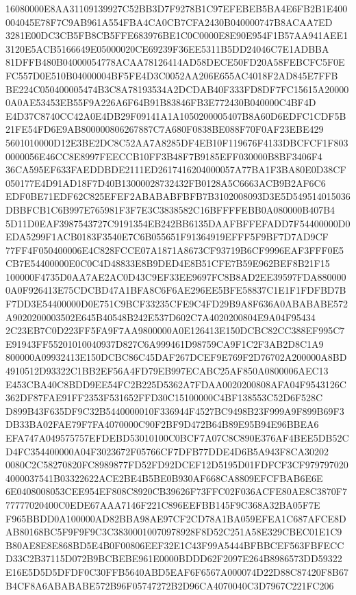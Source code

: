 \documentclass[UTF8,fontset=fandol,zihao=-4,a4paper]{ctexart}
\begin{document}
{{16080000E8AA31109139927C52BB3D7F9278B1C97EFEBEB5BA4E6FB2B1E400004045E78F7C9AB961A554FBA4CA0CB7CFA2430B040000747B8ACAA7ED
3281E00DC3CB5FB8CB5FFE683976BE1C0C0000E8E90E954F1B57AA941AEE13120E5ACB5166649E05000020CE69239F36EE5311B5DD24046C7E1ADBBA
81DFFB480B04000054778ACAA78126414AD58DECE50FD20A58FEBCFC5F0EFC557D0E510B04000004BF5FE4D3C0052AA206E655AC4018F2AD845E7FFB
BE224C050400005474B3C8A78193534A2DCDAB40F333FD8DF7FC15615A200000A0AE53453EB55F9A226A6F64B91B83846FB3E772430B040000C4BF4D
E4D37C8740CC42A0E4DB29F09141A1A1050200005407B8A60D6EDFC1CDF5B21FE54FD6E9AB800000806267887C7A680F0838BE088F70F0AF23EBE429
5601010000D12E3BE2DC8C52AA7A8285DF4EB10F119676F4133DBCFCF1F8030000056E46CC8E8997FEECCB10FF3B48F7B9185EFF030000B8BF3406F4
36CA595EF633FAEDDBDE2111ED2617416204000057A77BA1F3BA80E0D38CF050177E4D91AD18F7D40B13000028732432FB0128A5C6663ACB9B2AF6C6
EDF0BE71EDF62C825EFEF2ABABABFBFB7B3102008093D3E5D549514015036DBBFCB1C6B997E765981F3F7E3C3838582C16BFFFFEBB0A080000B407B4
5D11D0EAF3987543727C9191354EB242BB6135DAAFBFFEFADD7F54400000D0EDA5299F1ACB0183F3540E7C6B055651F91364919EFFF5F9BF7D7AD9CF
77FF4F050400006E4C828FCCE07A1871A8673CF93719B6CF9996EAF3FFF0E5CB7E54400000E0C0C4D48833E8B9DED4E8B51CFE7B59E962BEF8B21F15
100000F4735D0AA7AE2AC0D43C9EF33EE9697FC8B8AD2EE39597FDA8800000A0F926413E75CDCBD47A1BFA8C6F6AE296EE5BFE58837C1E1F1FDFBD7B
F7DD3E54400000D0E751C9BCF33235CFE9C4FD29B9A8F636A0ABABABE572A9020200003502E645B40548B242E537D602C7A4020200804E9A04F95434
2C23EB7C0D223FF5FA9F7AA9800000A0E126413E150DCBC82CC388EF995C7E91943FF55201010040937D827C6A999461D98759CA9F1C2F3AB2D8C1A9
800000A09932413E150DCBC86C45DAF267DCEF9E769F2D76702A200000A8BD4910512D93322C1BB2EF56A4FD79EB997ECABC25AF850A0800006AEC13
E453CBA40C8BDD9EE54FC2B225D5362A7FDAA0020200808AFA04F9543126C362DF87FAE91FF2353F531652FFD30C15100000C4BF138553C52D6F528C
D899B43F635DF9C32B5440000010F336944F4527BC9498B23F999A9F899B69F3DB33BA02FAE79F7FA4070000C90F2BF9D472B64B89E95B94E96BBEA6
EFA747A049575757EFDEBD53010100C0BCF7A07C8C890E376AF4BEE5DB52CD4FC354400000A04F3023672F05766CF7DFB77DDE4D6B5A943F8CA30202
0080C2C58270820FC8989877FD52FD92DCEF12D5195D01FDFCF3CF9797970204000037541B03322622ACE2BE4B5BE0B930AF668CA8809EFCFBAB6E6E
6E0408008053CEE954EF808C8920CB39626F73FFC02F036ACFE80AE8C3870F777777020400C0EDE67AAA7146F221C896EEFBB145F9C368A32BA05F7E
F965BBDD0A100000AD82BBA98AE97CF2CD78A1BA059EFEA1C687AFCE8DAB80168BC5F9F9F9C3C38300010070978928F8D52C251A58E329CBEC01E1C9
B80AE8E8E868BD5E4B0F00806EEF32E1C43F99A5444BFBBCEF563FBFECCD33C2B37115D072B9BCBEBE961E0000BDDD62F2097E264B8986573DD59322
E16E5D5D5DFDF0C30FFB5640ABD5EAF6F6567A000074D22D88C87420F8B67B4CF8A6ABABABE572B96F05747272B2D96CA4070040C3D7967C221FC206
}}
\end{document}
